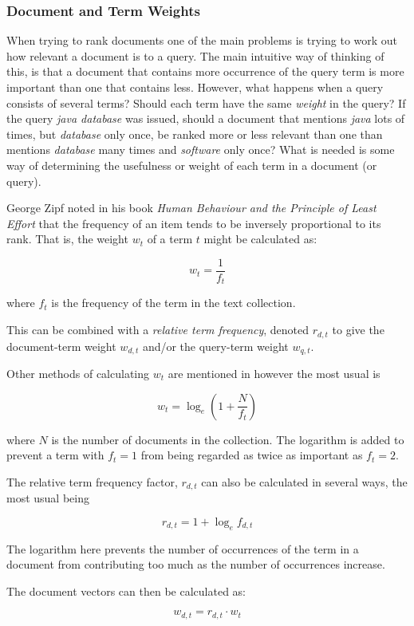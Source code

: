 \subsubsection{Document and Term Weights}
When trying to rank documents one of the main problems is trying to work out how relevant a document is to a query.  The main intuitive way of thinking of this, is that a document that contains more occurrence of the query term is more important than one that contains less.  However, what happens when a query consists of several terms? Should each term have the same \emph{weight} in the query?  If the query \emph{java database} was issued, should a document that mentions \emph{java} lots of times, but \emph{database} only once, be ranked more or less relevant than one than mentions \emph{database} many times and \emph{software} only once?  What is needed is some way of determining the usefulness or weight of each term in a document (or query).

George Zipf noted in his book \emph{Human Behaviour and the Principle of Least Effort} \cite{zipf49} that the frequency of an item tends to be inversely proportional to its rank.  That is, the weight $w_t$ of a term $t$ might be calculated as:

\[
w_t = \frac{1}{f_t}
\]

where $f_t$ is the frequency of the term in the text collection.

This can be combined with a \emph{relative term frequency}, denoted $r_{d,t}$ to give the document-term weight $w_{d,t}$ and/or the query-term weight $w_{q,t}$.

Other methods of calculating $w_t$ are mentioned in \cite{wmb:mg} however the most usual is

\[
w_t = \log_e \left( 1 + \frac{N}{f_t}\right)
\]

where $N$ is the number of documents in the collection.  The logarithm is added to prevent a term with $f_t =1$ from being regarded as twice as important as $f_t = 2$.

The relative term frequency factor, $r_{d,t}$ can also be calculated in several ways, the most usual being

\[
r_{d,t} = 1 + \log_e f_{d,t}
\]

The logarithm here prevents the number of occurrences of the term in a document from contributing too much as the number of occurrences increase.

The document vectors can then be calculated as:

\[
w_{d,t} = r_{d,t} \cdot w_t
\]

